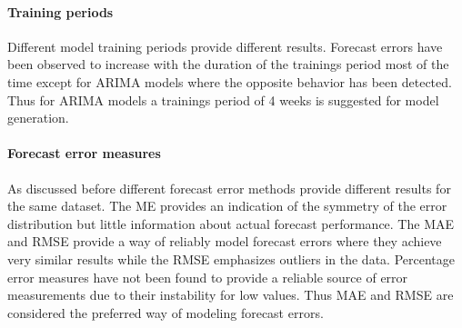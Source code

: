 \paragraph{Training periods}

Different model training periods provide different results. Forecast errors have been observed to increase with the duration of the trainings period most of the time except for ARIMA models where the opposite behavior has been detected. Thus for ARIMA models a trainings period of 4 weeks is suggested for model generation. 

\paragraph{Forecast error measures}

As discussed before different forecast error methods provide different results for the same dataset. The ME provides an indication of the symmetry of the error distribution but little information about actual forecast performance. The MAE and RMSE provide a way of reliably model forecast errors where they achieve very similar results while the RMSE emphasizes outliers in the data. Percentage error measures have not been found to provide a reliable source of error measurements due to their instability for low values. Thus MAE and RMSE are considered the preferred way of modeling forecast errors. 






